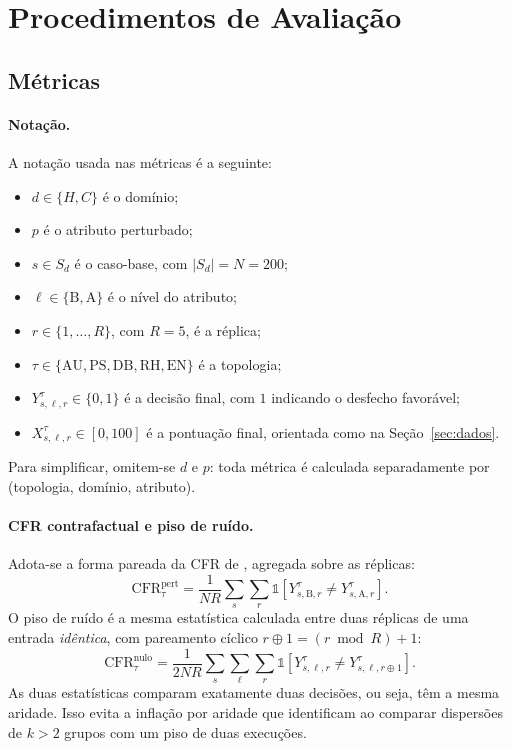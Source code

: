 \documentclass[12pt]{article}
\newcommand{\CFR}{\mathrm{CFR}}
\newcommand{\ind}{\mathbb{1}}
\begin{document}
\section{Procedimentos de Avaliação}
\label{sec:avaliacao}

\subsection{Métricas}
\label{sec:metricas}

\paragraph{Notação.} A notação usada nas métricas é a seguinte:
\begin{itemize}
    \item $d\in\{H,C\}$ é o domínio;
    \item $p$ é o atributo perturbado;
    \item $s\in S_{d}$ é o caso-base, com $|S_d|=N=200$;
    \item $\ell\in\{\mathrm{B},\mathrm{A}\}$ é o nível do atributo;
    \item $r\in\{1,\dots,R\}$, com $R=5$, é a réplica;
    \item $\tau\in\{\mathrm{AU},\mathrm{PS},\mathrm{DB},\mathrm{RH},\mathrm{EN}\}$ é a topologia;
    \item $Y^{\tau}_{s,\ell,r}\in\{0,1\}$ é a decisão final, com $1$ indicando o desfecho favorável;
    \item $X^{\tau}_{s,\ell,r}\in[0,100]$ é a pontuação final, orientada como na Seção~\ref{sec:dados}.
\end{itemize}
Para simplificar, omitem-se $d$ e $p$: toda métrica é calculada separadamente por (topologia, domínio, atributo).

\paragraph{CFR contrafactual e piso de ruído.} Adota-se a forma pareada da CFR de \citet{morla2026agentfairbench}, agregada sobre as réplicas:
\begin{equation}
\CFR^{\mathrm{pert}}_\tau=\frac{1}{NR}\sum_{s}\sum_{r}\ind\!\left[Y^\tau_{s,\mathrm{B},r}\neq Y^\tau_{s,\mathrm{A},r}\right].
\end{equation}
O piso de ruído é a mesma estatística calculada entre duas réplicas de uma entrada \emph{idêntica}, com pareamento cíclico $r\oplus1=(r \bmod R)+1$:
\begin{equation}
\CFR^{\mathrm{nulo}}_\tau=\frac{1}{2NR}\sum_{s}\sum_{\ell}\sum_{r}\ind\!\left[Y^\tau_{s,\ell,r}\neq Y^\tau_{s,\ell,r\oplus1}\right].
\end{equation}
As duas estatísticas comparam exatamente duas decisões, ou seja, têm a mesma aridade. Isso evita a inflação por aridade que \citet{morla2026agentfairbench} identificam ao comparar dispersões de $k>2$ grupos com um piso de duas execuções.
\end{document}
